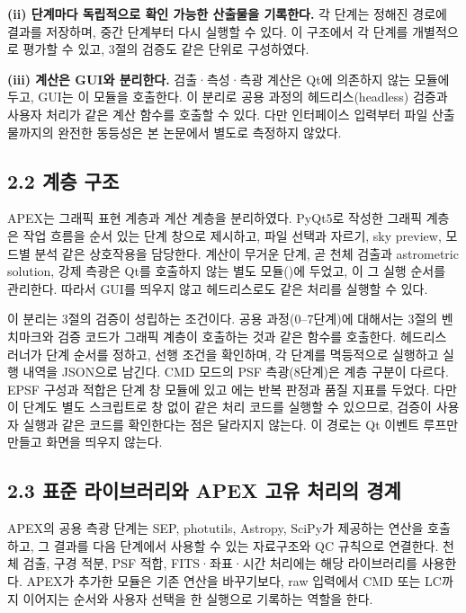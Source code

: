 \textbf{(ii) 단계마다 독립적으로 확인 가능한 산출물을 기록한다.} 각 단계는 정해진 경로에 결과를 저장하며, 중간 단계부터 다시 실행할 수 있다. 이 구조에서 각 단계를 개별적으로 평가할 수 있고, 3절의 검증도 같은 단위로 구성하였다.



\textbf{(iii) 계산은 GUI와 분리한다.} 검출·측성·측광 계산은 Qt에 의존하지 않는 모듈에 두고, GUI는 이 모듈을 호출한다. 이 분리로 공용 과정의 헤드리스(headless) 검증과 사용자 처리가 같은 계산 함수를 호출할 수 있다. 다만 인터페이스 입력부터 파일 산출물까지의 완전한 동등성은 본 논문에서 별도로 측정하지 않았다.



\subsection{2.2 계층 구조}

APEX는 그래픽 표현 계층과 계산 계층을 분리하였다. PyQt5로 작성한 그래픽 계층은 작업 흐름을 순서 있는 단계 창으로 제시하고, 파일 선택과 자르기, sky preview, 모드별 분석 같은 상호작용을 담당한다. 계산이 무거운 단계, 곧 천체 검출과 astrometric solution, 강제 측광은 Qt를 호출하지 않는 별도 모듈(\texttt{})에 두었고, \texttt{}이 그 실행 순서를 관리한다. 따라서 GUI를 띄우지 않고 헤드리스로도 같은 처리를 실행할 수 있다.



이 분리는 3절의 검증이 성립하는 조건이다. 공용 과정(0–7단계)에 대해서는 3절의 벤치마크와 검증 코드가 그래픽 계층이 호출하는 것과 같은 함수를 호출한다. 헤드리스 러너가 단계 순서를 정하고, 선행 조건을 확인하며, 각 단계를 멱등적으로 실행하고 실행 내역을 JSON으로 남긴다. CMD 모드의 PSF 측광(8단계)은 계층 구분이 다르다. EPSF 구성과 적합은 단계 창 모듈에 있고 \texttt{}에는 반복 판정과 품질 지표를 두었다. 다만 이 단계도 별도 스크립트로 창 없이 같은 처리 코드를 실행할 수 있으므로, 검증이 사용자 실행과 같은 코드를 확인한다는 점은 달라지지 않는다. 이 경로는 Qt 이벤트 루프만 만들고 화면을 띄우지 않는다.



\subsection{2.3 표준 라이브러리와 APEX 고유 처리의 경계}

APEX의 공용 측광 단계는 SEP, photutils, Astropy, SciPy가 제공하는 연산을 호출하고, 그 결과를 다음 단계에서 사용할 수 있는 자료구조와 QC 규칙으로 연결한다. 천체 검출, 구경 적분, PSF 적합, FITS·좌표·시간 처리에는 해당 라이브러리를 사용한다. APEX가 추가한 모듈은 기존 연산을 바꾸기보다, raw 입력에서 CMD 또는 LC까지 이어지는 순서와 사용자 선택을 한 실행으로 기록하는 역할을 한다.



